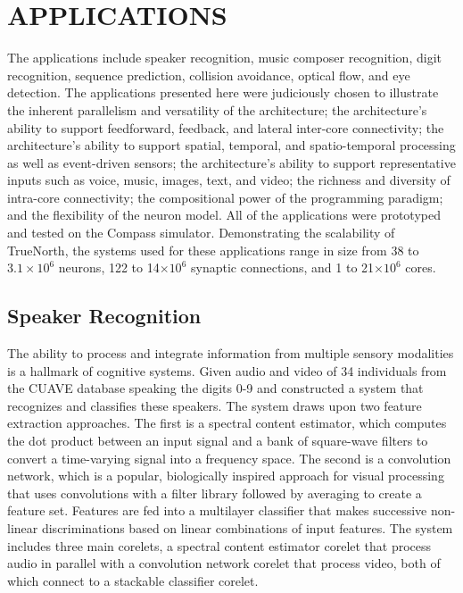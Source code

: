 \chapter{APPLICATIONS}
\hspace{2em} The applications include speaker recognition,
music composer recognition, digit recognition, sequence
prediction, collision avoidance, optical flow, and eye detection.
The applications presented here were judiciously chosen to
illustrate the inherent parallelism and versatility of the architecture;
the architecture's ability to support feedforward,
feedback, and lateral inter-core connectivity; the architecture's
ability to support spatial, temporal, and spatio-temporal processing
as well as event-driven sensors; the architecture's
ability to support representative inputs such as voice, music,
images, text, and video; the richness and diversity of intra-core
connectivity; the compositional power of the programming
paradigm; and the flexibility of the neuron model. All of
the applications were prototyped and tested on the Compass
simulator. Demonstrating the scalability of TrueNorth, the
systems used for these applications range in size from 38 to $3.1\times10^{6}$ neurons, 122 to 14$\times10^{6}$ synaptic connections, and
1 to 21$\times10^{6}$ cores.
\section{Speaker Recognition}
\hspace{2em} The ability to process and integrate information from
multiple sensory modalities is a hallmark of cognitive systems.
Given audio and video of 34 individuals from the CUAVE
database  speaking the digits 0-9 and constructed a system
that recognizes and classifies these speakers. The system draws
upon two feature extraction approaches. The first is a spectral
content estimator, which computes the dot product between
an input signal and a bank of square-wave filters to convert
a time-varying signal into a frequency space. The second is a
convolution network, which is a popular, biologically inspired
approach for visual processing  that uses convolutions with
a filter library followed by averaging to create a feature set.
Features are fed into a multilayer classifier that makes successive
non-linear discriminations based on linear combinations
of input features. The system includes three main corelets, a
spectral content estimator corelet that process audio in parallel
with a convolution network corelet that process video, both of
which connect to a stackable classifier corelet.

